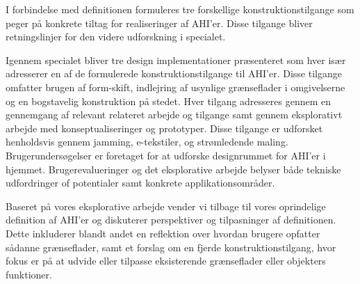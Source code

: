 I forbindelse med definitionen formuleres tre forskellige konstruktionstilgange som peger på konkrete tiltag for realiseringer af AHI'er.
Disse tilgange bliver retningslinjer for den videre udforskning i specialet.

Igennem specialet bliver tre design implementationer præsenteret som hver især adresserer en af de formulerede konstruktionstilgange til AHI'er.
Disse tilgange omfatter brugen af form-skift, indlejring af usynlige grænseflader i omgivelserne og en bogstavelig konstruktion på stedet.
Hver tilgang adresseres gennem en gennemgang af relevant relateret arbejde og tilgange samt gennem eksplorativt arbejde med konseptualiseringer og prototyper.
Disse tilgange er udforsket henholdsvis gennem jamming, e-tekstiler, og strømledende maling.
Brugerundersøgelser er foretaget for at udforske designrummet for AHI'er i hjemmet.
Brugerevalueringer og det eksplorative arbejde belyser både tekniske udfordringer of potentialer samt konkrete applikationsområder.

Baseret på vores eksplorative arbejde vender vi tilbage til vores oprindelige definition af AHI'er og diskuterer perspektiver og tilpasninger af definitionen.
Dette inkluderer blandt andet en reflektion over hvordan brugere opfatter sådanne grænseflader, samt et forslag om en fjerde konstruktionstilgang, hvor fokus er på at udvide eller tilpasse eksisterende grænseflader eller objekters funktioner.
